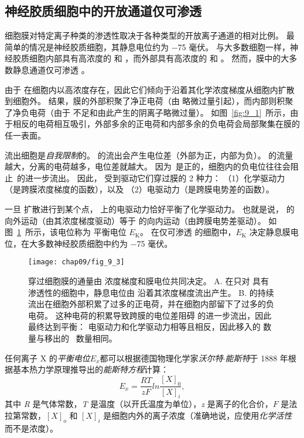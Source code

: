 \subsection{神经胶质细胞中的开放通道仅可渗透~}

细胞膜对特定离子种类的渗透性取决于各种类型的开放离子通道的相对比例。
最简单的情况是神经胶质细胞，其静息电位约为 −75 毫伏。
与大多数细胞一样，神经胶质细胞内部具有高浓度的  和 ，而外部具有高浓度的  和 。
然而，膜中的大多数静息通道仅可渗透 。


由于  在细胞内以高浓度存在，因此它们倾向于沿着其化学浓度梯度从细胞内扩散到细胞外。
结果，膜的外部积聚了净正电荷（由  略微过量引起），而内部则积聚了净负电荷（由于  不足和由此产生的阴离子略微过量）。
如图~\ref{fig:9_1}~所示，由于相反的电荷相互吸引，外部多余的正电荷和内部多余的负电荷会局部聚集在膜的任一表面。


 流出细胞是\textit{自我限制}的。
 的流出会产生电位差（外部为正，内部为负）。
 的流量越大，分离的电荷越多，电位差就越大。
因为~是正的，细胞内的负电位往往会阻止~的进一步流出。
因此， 受到驱动它们穿过膜的 2 种力：
（1）化学驱动力（是跨膜浓度梯度的函数），以及
（2）电驱动力（是跨膜电势差的函数）。


一旦  扩散进行到某个点， 上的电驱动力恰好平衡了化学驱动力。
也就是说， 的向外运动（由其浓度梯度驱动）等于  的向内运动（由跨膜电势差驱动）。
如图~\ref{fig:9_3}~所示，该电位称为  平衡电位 $E_\text{K}$。
在仅可渗透  的细胞中，$E_\text{K}$ 决定静息膜电位，在大多数神经胶质细胞中约为 −75 毫伏。


\begin{figure}[htbp]
	\centering
	\texttt{[image: chap09/fig\_9\_3]}
	\caption{ 穿过细胞膜的通量由  浓度梯度和膜电位共同决定。
		A. 在只对  具有渗透性的细胞中，静息电位由  沿着其浓度梯度流出产生。
		B.  的持续流出在细胞外部积累了过多的正电荷，并在细胞内部留下了过多的负电荷。
		这种电荷的积累导致跨膜的电位差阻碍  的进一步流出，因此最终达到平衡：
		电驱动力和化学驱动力相等且相反，因此移入的  数量与移出的~ 数量相同。}
	\label{fig:9_3}
\end{figure}


任何离子 X 的\textit{平衡电位}$E_x$都可以根据德国物理化学家\textit{沃尔特$\cdot$能斯特}于 1888 年根据基本热力学原理推导出的\textit{能斯特方程}计算：
\begin{equation}\label{eq:9_Nernst_Equation}
	E_x = \frac{RT}{zF} ln \frac{[X]_0}{[X]_i},
\end{equation}
其中 \textit{R} 是气体常数，\textit{T} 是温度（以开氏温度为单位），\textit{z} 是离子的化合价，$ F $ 是法拉第常数，$ [X]_o $ 和 $ [X]_i $ 是细胞内外的离子浓度（准确地说，应使用\textit{化学活性}而不是浓度）。


